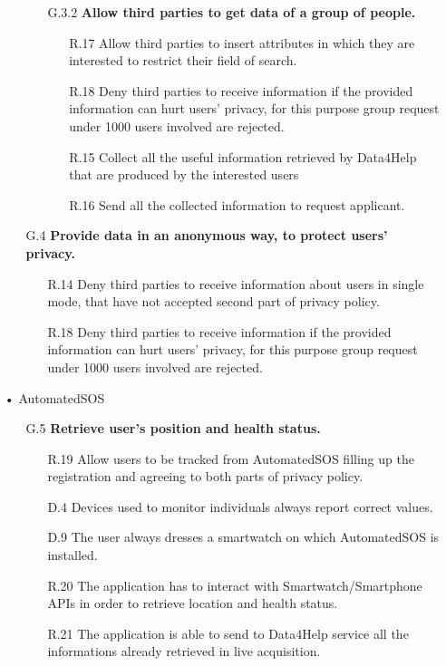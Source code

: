 \begin{enumerate}
\begin{enumerate}
\begin{enumerate}
    	\item [G.3.2] \textbf{Allow third parties to get data of a group of people.}
		\begin{enumerate}
    	\item [R.17] Allow third parties to insert attributes in which they are interested to restrict their field of search.
    	\item [R.18] Deny third parties to receive information if the provided information can hurt users' privacy, for this purpose group request under 1000 users involved are rejected.
    	\item [R.15] Collect all the useful information retrieved by Data4Help that are produced by the interested users 
    	\item [R.16] Send all the collected information to request applicant.
    	\end{enumerate}
    	\end{enumerate}
    	
    \item [G.4] \textbf{Provide data in an anonymous way, to protect users' privacy.}
		\begin{enumerate}
    	\item [R.14] Deny third parties to receive information about users in  single mode, that have not accepted second part of privacy policy.
    	\item [R.18] Deny third parties to receive information if the provided information can hurt users' privacy, for this purpose group request under 1000 users involved are rejected.
    	\end{enumerate}	
			
	\end{enumerate}
	
	
\item[•]{\Large AutomatedSOS}
	
	\begin{enumerate}
	\item [G.5] \textbf{Retrieve user's position and health status.}
		\begin{enumerate}
		\item [R.19] Allow users to be tracked from AutomatedSOS filling up the registration and agreeing to both parts of privacy policy.
		\item [D.4] Devices used to monitor individuals always report correct values.
		\item [D.9] The user always dresses a smartwatch on which AutomatedSOS is installed.    
		\item [R.20] The application has to interact with Smartwatch/Smartphone APIs in order to retrieve location and health status.
		\item [R.21] The application is able to send to Data4Help service all the informations already retrieved in live acquisition.
		\end{enumerate}
		

\end{enumerate}
\end{enumerate}
